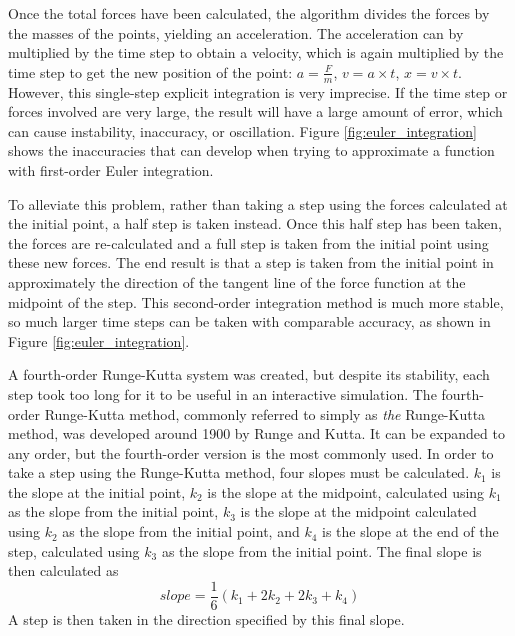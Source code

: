 \documentclass{thesis}
\begin{document}
Once the total forces have been calculated, the algorithm divides the forces by the masses of the points, yielding an acceleration.
The acceleration can by multiplied by the time step to obtain a velocity, which is again multiplied by the time step to get the new
position of the point: $a=\frac{F}{m}$, $v=a\times t$, $x=v\times t$.
However, this single-step explicit integration is very imprecise.  If the time step or forces involved are very large, the result will
have a large amount of error, which can cause instability, inaccuracy, or oscillation.  Figure \ref{fig:euler_integration} shows the
inaccuracies that can develop when trying to approximate a function with first-order Euler integration.

To alleviate this problem, rather than taking a step using the forces calculated at the initial point, a half step is taken instead.
Once this half step has been taken, the forces are re-calculated and a full step is taken from the initial point using these new forces.
The end result is that a step is taken from the initial point in approximately the direction of the tangent line of the force function at
the midpoint of the step. This second-order integration method is much more stable, so much larger time steps can be taken with comparable
accuracy, as shown in Figure \ref{fig:euler_integration}.

A fourth-order Runge-Kutta system was created, but despite its stability, each step took too long for it to be useful in an interactive
simulation.  The fourth-order Runge-Kutta method, commonly referred to simply as \emph{the} Runge-Kutta method, was developed around 1900
by Runge and Kutta.  It can be expanded to any order, but the fourth-order version is the most commonly used.  In order to take a step
using the Runge-Kutta method, four slopes must be calculated.  $k_1$ is the slope at the initial point, $k_2$ is the slope at the midpoint,
calculated using $k_1$ as the slope from the initial point, $k_3$ is the slope at the midpoint calculated using $k_2$ as the slope from the
initial point, and $k_4$ is the slope at the end of the step, calculated using $k_3$ as the slope from the initial point.  The final slope
is then calculated as \[slope=\frac{1}{6}(k_1+2k_2+2k_3+k_4)\]  A step is then taken in the direction specified by this final slope.
\end{document}
